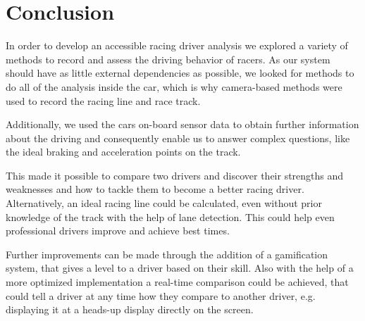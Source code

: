 \section{Conclusion}
\label{sec:conclusion}
In order to develop an accessible racing driver analysis we explored a variety of methods to record and assess the driving behavior of racers. As our system should have as little external dependencies as possible, we looked for methods to do all of the analysis inside the car, which is why camera-based methods were used to record the racing line and race track. 

Additionally, we used the cars on-board sensor data to obtain further information about the driving and consequently enable us to answer complex questions, like the ideal braking and acceleration points on the track.

This made it possible to compare two drivers and discover their strengths and weaknesses and how to tackle them to become a better racing driver. Alternatively, an ideal racing line could be calculated, even without prior knowledge of the track with the help of lane detection. This could help even professional drivers improve and achieve best times.

Further improvements can be made through the addition of a gamification system, that gives a level to a driver based on their skill. Also with the help of a more optimized implementation a real-time comparison could be achieved, that could tell a driver at any time how they compare to another driver, e.g. displaying it at a heads-up display directly on the screen.
\clearpage
